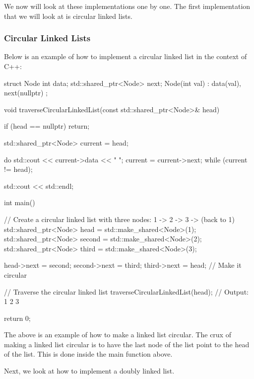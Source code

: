 We now will look at these implementations one by one. The first implementation that we will look at is circular linked lists.

\begin{highlight}

\subsubsection*{Circular Linked Lists}

Below is an example of how to implement a circular linked list in the context of C++:

\begin{code}
struct Node {
    int data;
    std::shared_ptr<Node> next;
    Node(int val) : data(val), next(nullptr) {}
};

void traverseCircularLinkedList(const std::shared_ptr<Node>& head) {
    if (head == nullptr) {
        return;
    }

    std::shared_ptr<Node> current = head;

    do {
        std::cout << current->data << " ";
        current = current->next;
    } while (current != head);

    std::cout << std::endl;
}

int main() {
    // Create a circular linked list with three nodes: 1 -> 2 -> 3 -> (back to 1)
    std::shared_ptr<Node> head = std::make_shared<Node>(1);
    std::shared_ptr<Node> second = std::make_shared<Node>(2);
    std::shared_ptr<Node> third = std::make_shared<Node>(3);

    head->next = second;
    second->next = third;
    third->next = head;  // Make it circular

    // Traverse the circular linked list
    traverseCircularLinkedList(head);  // Output: 1 2 3

    return 0;
}    
\end{code}

The above is an example of how to make a linked list circular. The crux of making a linked list circular is to have the last node of the list point to the head of the list. This is done inside the
main function above.

\end{highlight}

Next, we look at how to implement a doubly linked list.


